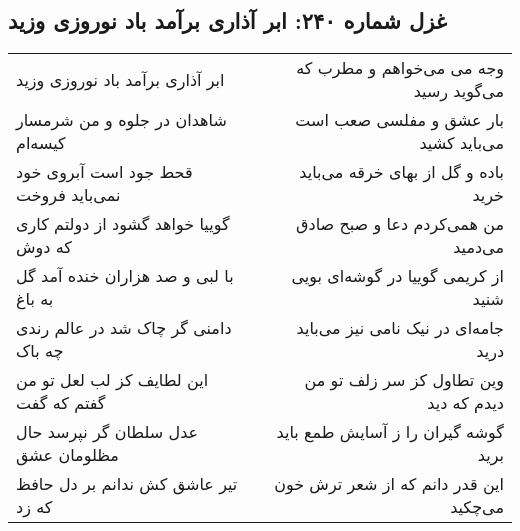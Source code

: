 \begin{center}
\section*{غزل شماره ۲۴۰: ابر آذاری برآمد باد نوروزی وزید}
\label{sec:sh240}
\begin{longtable}{l p{0.5cm} r}
ابر آذاری برآمد باد نوروزی وزید
&&
وجه می می‌خواهم و مطرب که می‌گوید رسید
\\
شاهدان در جلوه و من شرمسار کیسه‌ام
&&
بار عشق و مفلسی صعب است می‌باید کشید
\\
قحط جود است آبروی خود نمی‌باید فروخت
&&
باده و گل از بهای خرقه می‌باید خرید
\\
گوییا خواهد گشود از دولتم کاری که دوش
&&
من همی‌کردم دعا و صبح صادق می‌دمید
\\
با لبی و صد هزاران خنده آمد گل به باغ
&&
از کریمی گوییا در گوشه‌ای بویی شنید
\\
دامنی گر چاک شد در عالم رندی چه باک
&&
جامه‌ای در نیک نامی نیز می‌باید درید
\\
این لطایف کز لب لعل تو من گفتم که گفت
&&
وین تطاول کز سر زلف تو من دیدم که دید
\\
عدل سلطان گر نپرسد حال مظلومان عشق
&&
گوشه گیران را ز آسایش طمع باید برید
\\
تیر عاشق کش ندانم بر دل حافظ که زد
&&
این قدر دانم که از شعر ترش خون می‌چکید
\\
\end{longtable}
\end{center}
